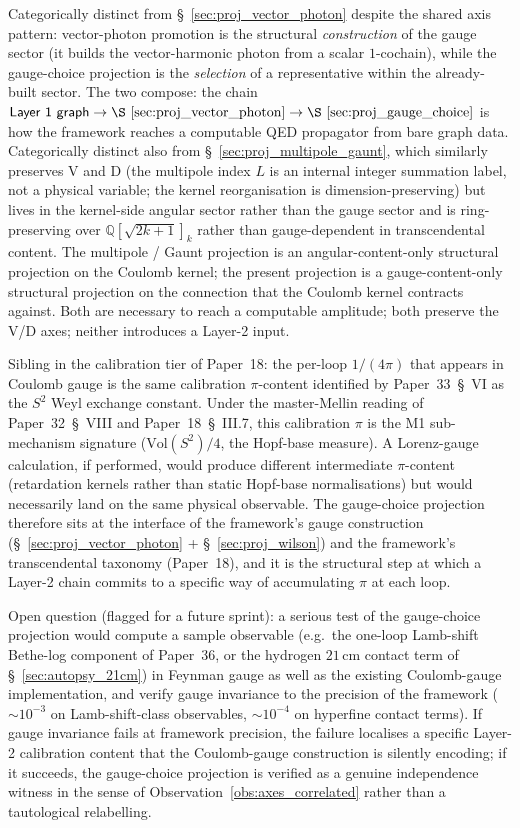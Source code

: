 \documentclass[11pt]{article}
\begin{document}
Categorically distinct from \S~\ref{sec:proj_vector_photon} despite
the shared axis pattern: vector-photon promotion is the structural
\emph{construction} of the gauge sector (it builds the vector-harmonic
photon from a scalar $1$-cochain), while the gauge-choice projection
is the \emph{selection} of a representative within the already-built
sector.  The two compose: the chain $\textsf{Layer~1 graph} \to
\S~\ref{sec:proj_vector_photon} \to \S~\ref{sec:proj_gauge_choice}$ is
how the framework reaches a computable QED propagator from bare graph
data.  Categorically distinct also from
\S~\ref{sec:proj_multipole_gaunt}, which similarly preserves V and D
(the multipole index $L$ is an internal integer summation label, not
a physical variable; the kernel reorganisation is dimension-preserving)
but lives in the kernel-side angular sector rather than the gauge
sector and is ring-preserving over $\mathbb{Q}[\sqrt{2k{+}1}]_k$ rather
than gauge-dependent in transcendental content.  The multipole / Gaunt
projection is an angular-content-only structural projection on the
Coulomb kernel; the present projection is a gauge-content-only
structural projection on the connection that the Coulomb kernel
contracts against.  Both are necessary to reach a computable
amplitude; both preserve the V/D axes; neither introduces a Layer-2
input.

Sibling in the calibration tier of Paper~18: the per-loop $1/(4\pi)$
that appears in Coulomb gauge is the same calibration $\pi$-content
identified by Paper~33~\S~VI as the $S^2$ Weyl exchange constant.
Under the master-Mellin reading of Paper~32~\S~VIII and
Paper~18~\S~III.7, this calibration $\pi$ is the M1 sub-mechanism
signature ($\mathrm{Vol}(S^2)/4$, the Hopf-base measure).  A
Lorenz-gauge calculation, if performed, would produce different
intermediate $\pi$-content (retardation kernels rather than static
Hopf-base normalisations) but would necessarily land on the same
physical observable.  The gauge-choice projection therefore sits at
the interface of the framework's gauge construction
(\S~\ref{sec:proj_vector_photon} +
\S~\ref{sec:proj_wilson}) and the framework's transcendental taxonomy
(Paper~18), and it is the structural step at which a Layer-2 chain
commits to a specific way of accumulating $\pi$ at each loop.

Open question (flagged for a future sprint): a serious test of the
gauge-choice projection would compute a sample observable (e.g.\ the
one-loop Lamb-shift Bethe-log component of Paper~36, or the
hydrogen $21$\,cm contact term of \S~\ref{sec:autopsy_21cm}) in
Feynman gauge as well as the existing Coulomb-gauge implementation,
and verify gauge invariance to the precision of the framework
($\sim10^{-3}$ on Lamb-shift-class observables, $\sim10^{-4}$ on
hyperfine contact terms).  If gauge invariance fails at framework
precision, the failure localises a specific Layer-2 calibration
content that the Coulomb-gauge construction is silently encoding;
if it succeeds, the gauge-choice projection is verified as a
genuine independence witness in the sense of
Observation~\ref{obs:axes_correlated} rather than a tautological
relabelling.
\end{document}

